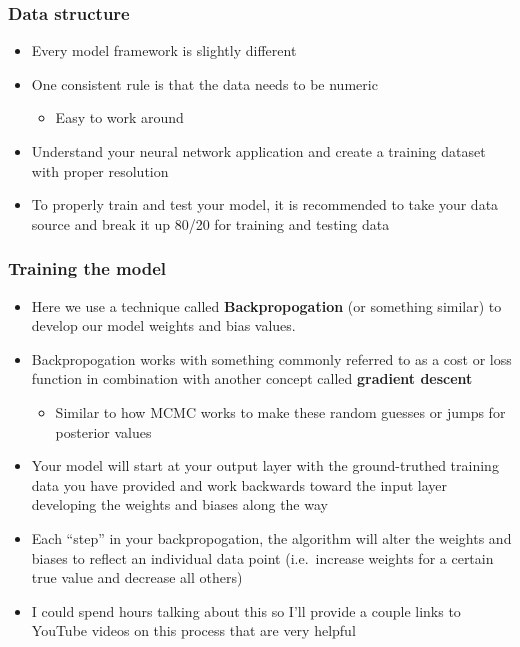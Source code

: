\documentclass[
]{article}
\providecommand{\tightlist}{%
  \setlength{\itemsep}{0pt}\setlength{\parskip}{0pt}}
\begin{document}
\hypertarget{data-structure}{%
\subsubsection{Data structure}\label{data-structure}}

\begin{itemize}
\tightlist
\item
  Every model framework is slightly different
\item
  One consistent rule is that the data needs to be numeric

  \begin{itemize}
  \tightlist
  \item
    Easy to work around
  \end{itemize}
\item
  Understand your neural network application and create a training
  dataset with proper resolution
\item
  To properly train and test your model, it is recommended to take your
  data source and break it up 80/20 for training and testing data
\end{itemize}

\hypertarget{training-the-model}{%
\subsubsection{Training the model}\label{training-the-model}}

\begin{itemize}
\tightlist
\item
  Here we use a technique called \textbf{Backpropogation} (or something
  similar) to develop our model weights and bias values.
\item
  Backpropogation works with something commonly referred to as a cost or
  loss function in combination with another concept called
  \textbf{gradient descent}

  \begin{itemize}
  \tightlist
  \item
    Similar to how MCMC works to make these random guesses or jumps for
    posterior values
  \end{itemize}
\item
  Your model will start at your output layer with the ground-truthed
  training data you have provided and work backwards toward the input
  layer developing the weights and biases along the way
\item
  Each ``step'' in your backpropogation, the algorithm will alter the
  weights and biases to reflect an individual data point (i.e.~increase
  weights for a certain true value and decrease all others)
\item
  I could spend hours talking about this so I'll provide a couple links
  to YouTube videos on this process that are very helpful
\end{itemize}
\end{document}
